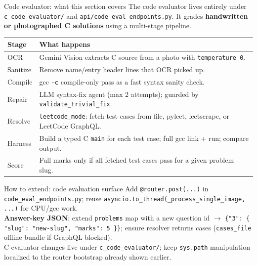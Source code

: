 \documentclass[aspectratio=169]{beamer}
\begin{document}
\begin{frame}{Code evaluator: what this section covers}
  \small
  The code evaluator lives entirely under \texttt{c\_code\_evaluator/} and \texttt{api/code\_eval\_endpoints.py}.
  It grades \textbf{handwritten or photographed C solutions} using a multi-stage pipeline.\\[0.4em]
  \begin{tabular}{@{}p{2.3cm}p{11.4cm}@{}}
    \toprule
    Stage & What happens \\
    \midrule
    OCR & Gemini Vision extracts C source from a photo with \texttt{temperature 0}. \\
    Sanitize & Remove name/entry header lines that OCR picked up. \\
    Compile & gcc \texttt{-c} compile-only pass as a fast syntax sanity check. \\
    Repair & LLM syntax-fix agent (max 2 attempts); guarded by \texttt{validate\_trivial\_fix}. \\
    Resolve & \texttt{leetcode\_mode}: fetch test cases from file, pyleet, leetscrape, or LeetCode GraphQL. \\
    Harness & Build a typed C \texttt{main} for each test case; full gcc link + run; compare output. \\
    Score & Full marks only if all fetched test cases pass for a given problem slug. \\
    \bottomrule
  \end{tabular}
\end{frame}

\begin{frame}{How to extend: code evaluation surface}
  \small
  Add \texttt{@router.post(...)} in \texttt{code\_eval\_endpoints.py}; reuse \texttt{asyncio.to\_thread(\_process\_single\_image, ...)} for CPU/gcc work.\\
  \textbf{Answer-key JSON}: extend \texttt{problems} map with a new question id $\rightarrow$ \texttt{\{"3": \{ "slug": "new-slug", "marks": 5 \}\}}; ensure resolver returns cases (\texttt{cases\_file} offline bundle if GraphQL blocked).\\
  C evaluator changes live under \texttt{c\_code\_evaluator/}; keep \texttt{sys.path} manipulation localized to the router bootstrap already shown earlier.
\end{frame}
\end{document}
